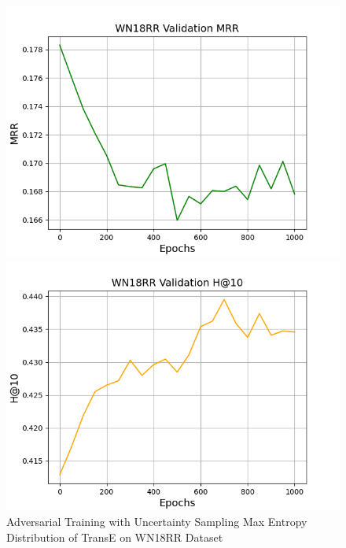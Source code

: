 \begin{figure}
\begin{minipage}{.5\textwidth}
      \includegraphics[width=0.9\linewidth]{figures/results/WN18RR/AdversarialTraining/Uncertainty/Max_Entropy_Distribution/gan_train_wn18rr_mrr.png}
   \end{minipage}%
    \begin{minipage}{.5\textwidth}
      \centering
      \includegraphics[width=0.9\linewidth]{figures/results/WN18RR/AdversarialTraining/Uncertainty/Max_Entropy_Distribution/gan_train_wn18rr_hit10.png}
    \end{minipage}%
    \caption{Adversarial Training with Uncertainty Sampling Max Entropy Distribution of TransE on WN18RR Dataset}
    \label{fig:test}
\end{figure}

\pagebreak

